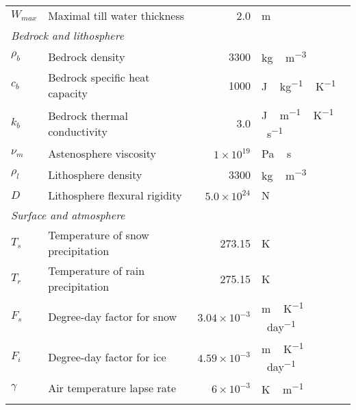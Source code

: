 \documentclass[tc]{copernicus}
\begin{document}
\begin{table*}
{\begin{tabular}{llrl}
    $W_{max}$ & Maximal till water thickness
            & 2.0
            & m \\

    \multicolumn{2}{l}{\emph{Bedrock and lithosphere}} \\

    $\rho_b$& Bedrock density
            & 3300
            & \unit{kg\,m^{-3}} \\

    $c_b$   & Bedrock specific heat capacity
            & 1000
            & \unit{J\,kg^{-1}\,K^{-1}} \\

    $k_b$   & Bedrock thermal conductivity
            & 3.0
            & \unit{J\,m^{-1}\,K^{-1}\,s^{-1}} \\

    $\nu_m$ & Astenosphere viscosity
            & $1\times10^{19}$
            & \unit{Pa\,s} \\

    $\rho_l$& Lithosphere density
            & 3300
            & \unit{kg\,m^{-3}} \\

    $D$     & Lithosphere flexural rigidity
            & $5.0\times10^{24}$
            & \unit{N} \\

    \multicolumn{2}{l}{\emph{Surface and atmosphere}} \\

    $T_s$   & Temperature of snow precipitation
            & 273.15
            & \unit{K} \\

    $T_r$   & Temperature of rain precipitation
            & 275.15
            & \unit{K} \\

    $F_s$   & Degree-day factor for snow
            & $3.04\times10^{-3}$
            & \unit{m\,K^{-1}\,day^{-1}} \\

    $F_i$   & Degree-day factor for ice
            & $4.59\times10^{-3}$
            & \unit{m\,K^{-1}\,day^{-1}} \\

    $\gamma$& Air temperature lapse rate
            & $6\times10^{-3}$
            & \unit{K\,m^{-1}} \\

    \bottomhline
  \end{tabular}}
  \belowtable{}
\end{table*}
\end{document}
